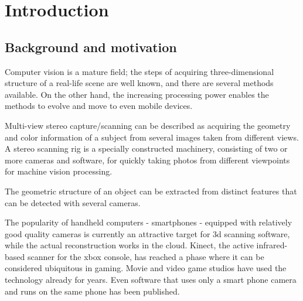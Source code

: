 \section{Introduction}



\thispagestyle{empty}

\subsection{Background and motivation}

Computer vision is a mature field; the steps of acquiring three-dimensional structure of a real-life scene are well known, and there are several methods available.
On the other hand, the increasing processing power enables the methods to evolve and move to even mobile devices.

Multi-view stereo capture/scanning can be described as acquiring the geometry and color information of a subject from several images taken from different views.
A stereo scanning rig is a specially constructed machinery, consisting of two or more cameras and software, for quickly taking photos from different viewpoints for machine vision processing.

The geometric structure of an object can be extracted from distinct features that can be detected with several cameras.

The popularity of handheld computers - smartphones - equipped with relatively good quality cameras is currently an attractive target for 3d scanning software, while the actual reconstruction works in the cloud.
Kinect, the active infrared-based scanner for the xbox console, has reached a phase where it can be considered ubiquitous in gaming.
Movie and video game studios have used the technology already for years.
Even software that uses only a smart phone camera and runs on the same phone has been published.

